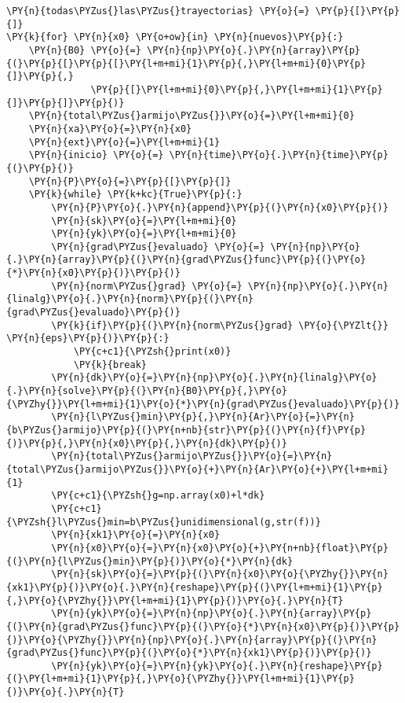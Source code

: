 \begin{itemize}
\begin{tcolorbox}[breakable, size=fbox, boxrule=1pt, pad at break*=1mm,colback=cellbackground, colframe=cellborder]
\begin{Verbatim}[commandchars=\\\{\}]
\PY{n}{todas\PYZus{}las\PYZus{}trayectorias} \PY{o}{=} \PY{p}{[}\PY{p}{]}
\PY{k}{for} \PY{n}{x0} \PY{o+ow}{in} \PY{n}{nuevos}\PY{p}{:}
    \PY{n}{B0} \PY{o}{=} \PY{n}{np}\PY{o}{.}\PY{n}{array}\PY{p}{(}\PY{p}{[}\PY{p}{[}\PY{l+m+mi}{1}\PY{p}{,}\PY{l+m+mi}{0}\PY{p}{]}\PY{p}{,}
               \PY{p}{[}\PY{l+m+mi}{0}\PY{p}{,}\PY{l+m+mi}{1}\PY{p}{]}\PY{p}{]}\PY{p}{)}
    \PY{n}{total\PYZus{}armijo\PYZus{}}\PY{o}{=}\PY{l+m+mi}{0}
    \PY{n}{xa}\PY{o}{=}\PY{n}{x0}
    \PY{n}{ext}\PY{o}{=}\PY{l+m+mi}{1}
    \PY{n}{inicio} \PY{o}{=} \PY{n}{time}\PY{o}{.}\PY{n}{time}\PY{p}{(}\PY{p}{)}
    \PY{n}{P}\PY{o}{=}\PY{p}{[}\PY{p}{]}
    \PY{k}{while} \PY{k+kc}{True}\PY{p}{:}
        \PY{n}{P}\PY{o}{.}\PY{n}{append}\PY{p}{(}\PY{n}{x0}\PY{p}{)}
        \PY{n}{sk}\PY{o}{=}\PY{l+m+mi}{0}
        \PY{n}{yk}\PY{o}{=}\PY{l+m+mi}{0}
        \PY{n}{grad\PYZus{}evaluado} \PY{o}{=} \PY{n}{np}\PY{o}{.}\PY{n}{array}\PY{p}{(}\PY{n}{grad\PYZus{}func}\PY{p}{(}\PY{o}{*}\PY{n}{x0}\PY{p}{)}\PY{p}{)}
        \PY{n}{norm\PYZus{}grad} \PY{o}{=} \PY{n}{np}\PY{o}{.}\PY{n}{linalg}\PY{o}{.}\PY{n}{norm}\PY{p}{(}\PY{n}{grad\PYZus{}evaluado}\PY{p}{)}
        \PY{k}{if}\PY{p}{(}\PY{n}{norm\PYZus{}grad} \PY{o}{\PYZlt{}} \PY{n}{eps}\PY{p}{)}\PY{p}{:}
            \PY{c+c1}{\PYZsh{}print(x0)}
            \PY{k}{break}
        \PY{n}{dk}\PY{o}{=}\PY{n}{np}\PY{o}{.}\PY{n}{linalg}\PY{o}{.}\PY{n}{solve}\PY{p}{(}\PY{n}{B0}\PY{p}{,}\PY{o}{\PYZhy{}}\PY{l+m+mi}{1}\PY{o}{*}\PY{n}{grad\PYZus{}evaluado}\PY{p}{)}
        \PY{n}{l\PYZus{}min}\PY{p}{,}\PY{n}{Ar}\PY{o}{=}\PY{n}{b\PYZus{}armijo}\PY{p}{(}\PY{n+nb}{str}\PY{p}{(}\PY{n}{f}\PY{p}{)}\PY{p}{,}\PY{n}{x0}\PY{p}{,}\PY{n}{dk}\PY{p}{)}
        \PY{n}{total\PYZus{}armijo\PYZus{}}\PY{o}{=}\PY{n}{total\PYZus{}armijo\PYZus{}}\PY{o}{+}\PY{n}{Ar}\PY{o}{+}\PY{l+m+mi}{1}
        \PY{c+c1}{\PYZsh{}g=np.array(x0)+l*dk}
        \PY{c+c1}{\PYZsh{}l\PYZus{}min=b\PYZus{}unidimensional(g,str(f))}
        \PY{n}{xk1}\PY{o}{=}\PY{n}{x0}
        \PY{n}{x0}\PY{o}{=}\PY{n}{x0}\PY{o}{+}\PY{n+nb}{float}\PY{p}{(}\PY{n}{l\PYZus{}min}\PY{p}{)}\PY{o}{*}\PY{n}{dk}
        \PY{n}{sk}\PY{o}{=}\PY{p}{(}\PY{n}{x0}\PY{o}{\PYZhy{}}\PY{n}{xk1}\PY{p}{)}\PY{o}{.}\PY{n}{reshape}\PY{p}{(}\PY{l+m+mi}{1}\PY{p}{,}\PY{o}{\PYZhy{}}\PY{l+m+mi}{1}\PY{p}{)}\PY{o}{.}\PY{n}{T}
        \PY{n}{yk}\PY{o}{=}\PY{n}{np}\PY{o}{.}\PY{n}{array}\PY{p}{(}\PY{n}{grad\PYZus{}func}\PY{p}{(}\PY{o}{*}\PY{n}{x0}\PY{p}{)}\PY{p}{)}\PY{o}{\PYZhy{}}\PY{n}{np}\PY{o}{.}\PY{n}{array}\PY{p}{(}\PY{n}{grad\PYZus{}func}\PY{p}{(}\PY{o}{*}\PY{n}{xk1}\PY{p}{)}\PY{p}{)}
        \PY{n}{yk}\PY{o}{=}\PY{n}{yk}\PY{o}{.}\PY{n}{reshape}\PY{p}{(}\PY{l+m+mi}{1}\PY{p}{,}\PY{o}{\PYZhy{}}\PY{l+m+mi}{1}\PY{p}{)}\PY{o}{.}\PY{n}{T}

\end{Verbatim}
\end{tcolorbox}
\end{itemize}
